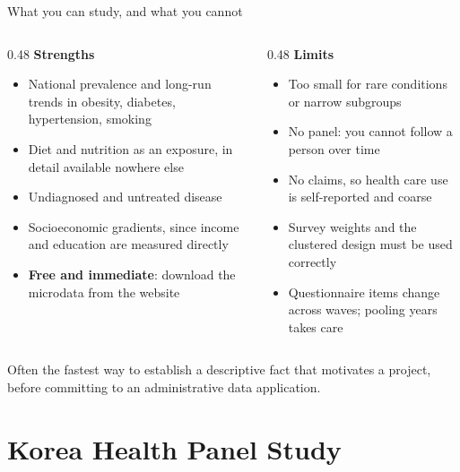 \documentclass[aspectratio=169,11pt]{beamer}
\newcommand{\hl}[1]{\textbf{\color{kdgreen}#1}}
\begin{document}
\begin{frame}{What you can study, and what you cannot}
  \begin{columns}[T]
    \begin{column}{0.48\textwidth}
      \textbf{\color{kdgreen}Strengths}
      \begin{itemize}\small
        \setlength{\itemsep}{6pt}
        \item National prevalence and long-run trends in obesity, diabetes,
              hypertension, smoking
        \item Diet and nutrition as an exposure, in detail available nowhere else
        \item Undiagnosed and untreated disease
        \item Socioeconomic gradients, since income and education are measured directly
        \item \hl{Free and immediate}: download the microdata from the website
      \end{itemize}
    \end{column}
    \begin{column}{0.48\textwidth}
      \textbf{\color{kdaccent}Limits}
      \begin{itemize}\small
        \setlength{\itemsep}{6pt}
        \item Too small for rare conditions or narrow subgroups
        \item No panel: you cannot follow a person over time
        \item No claims, so health care use is self-reported and coarse
        \item Survey weights and the clustered design must be used correctly
        \item Questionnaire items change across waves; pooling years takes care
      \end{itemize}
    \end{column}
  \end{columns}
  \vspace{6pt}
  {\small Often the fastest way to establish a descriptive fact that motivates a
  project, before committing to an administrative data application.}
\end{frame}

\section{Korea Health Panel Study}
\end{document}
